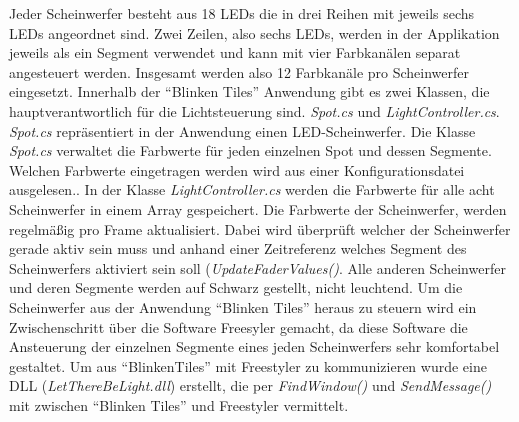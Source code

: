 Jeder Scheinwerfer besteht aus 18 LEDs die in drei Reihen mit jeweils sechs LEDs angeordnet sind. Zwei Zeilen, also sechs LEDs, werden in der Applikation jeweils als ein Segment verwendet und  kann mit vier Farbkanälen separat angesteuert werden. Insgesamt werden also 12 Farbkanäle pro Scheinwerfer eingesetzt. Innerhalb der \enquote{Blinken Tiles} Anwendung gibt es zwei Klassen, die hauptverantwortlich für die Lichtsteuerung sind. \emph{Spot.cs} und \emph{LightController.cs}. \emph{Spot.cs} repräsentiert in der Anwendung einen LED-Scheinwerfer. Die Klasse \emph{Spot.cs} verwaltet die Farbwerte für jeden einzelnen Spot und dessen Segmente. Welchen Farbwerte eingetragen werden wird aus einer Konfigurationsdatei ausgelesen.. In der Klasse \emph{LightController.cs} werden die Farbwerte für alle acht Scheinwerfer in einem Array gespeichert. Die Farbwerte der Scheinwerfer, werden regelmäßig pro Frame aktualisiert. Dabei wird überprüft welcher der Scheinwerfer gerade aktiv sein muss und anhand einer Zeitreferenz welches Segment des Scheinwerfers aktiviert sein soll (\emph{UpdateFaderValues()}. Alle anderen Scheinwerfer und deren Segmente werden auf Schwarz gestellt, nicht leuchtend. 
Um die Scheinwerfer aus der Anwendung \enquote{Blinken Tiles} heraus zu steuern wird ein Zwischenschritt über die Software Freesyler gemacht, da diese Software die Ansteuerung der einzelnen Segmente eines jeden Scheinwerfers sehr komfortabel gestaltet. Um aus \enquote{BlinkenTiles} mit Freestyler zu kommunizieren wurde eine DLL (\emph{LetThereBeLight.dll}) erstellt, die per \emph{FindWindow()} und \emph{SendMessage()} mit zwischen \enquote{Blinken Tiles} und Freestyler vermittelt.


